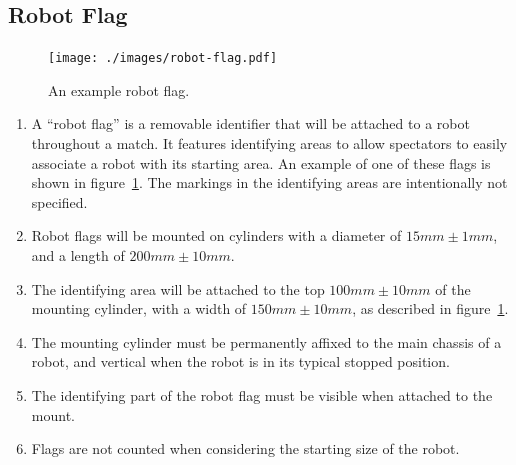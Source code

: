 \subsection{Robot Flag}
\label{sub:robot-flag}

\begin{figure}
  \centering
  \texttt{[image: ./images/robot-flag.pdf]}
  \caption{An example robot flag.}
  \label{fig:example-flag}
\end{figure}

\begin{enumerate}
  \item A ``robot flag'' is a removable identifier that will be attached to a robot throughout a match.
        It features identifying areas to allow spectators to easily associate a robot with its starting area.
        An example of one of these flags is shown in figure~\ref{fig:example-flag}.
        The markings in the identifying areas are intentionally not specified.

  \item Robot flags will be mounted on cylinders with a diameter of $15mm\pm1mm$,
        and a length of $200mm\pm10mm$.

  \item The identifying area will be attached to the top $100mm\pm10mm$ of the mounting cylinder,
        with a width of $150mm\pm10mm$, as described in figure~\ref{fig:example-flag}.

  \item The mounting cylinder must be permanently affixed to the main chassis of a robot, and vertical
        when the robot is in its typical stopped position.

  \item The identifying part of the robot flag must be visible when attached to the mount.

  \item Flags are not counted when considering the starting size of the robot.
\end{enumerate}


